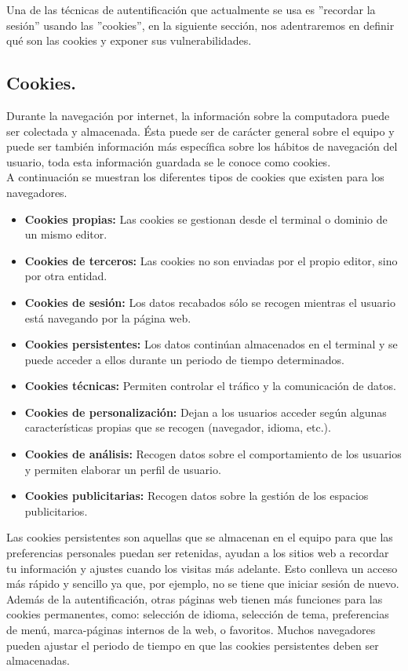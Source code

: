 \documentclass[12pt, a4paper, titlepage]{report}
\begin{document}
	    Una de las técnicas de autentificación que actualmente se usa es ''recordar la sesión'' usando las ''cookies'', en la siguiente sección, nos adentraremos en definir qué son las cookies y exponer sus vulnerabilidades.
	    
	    \subsection{Cookies. }
		Durante la navegación por internet, la información sobre la computadora puede ser colectada y almacenada. Ésta puede ser de carácter general sobre el equipo y puede ser también información más específica sobre los hábitos de navegación del usuario, toda esta información guardada se le conoce como \Gls{cookies}\cite{refCookies}. \\
		A continuación se muestran los diferentes tipos de cookies que existen para los navegadores.
		
		\begin{itemize}
		    \item \textbf{Cookies propias:} Las cookies se gestionan desde el terminal o dominio de un mismo editor.
		    \item \textbf{Cookies de terceros:} Las cookies no son enviadas por el propio editor, sino por otra entidad.  
		    \item \textbf{Cookies de sesión:} Los datos recabados sólo se recogen mientras el usuario está navegando por la página web.
		    \item \textbf{Cookies persistentes:} Los datos continúan almacenados en el terminal y se puede acceder a ellos durante un periodo de tiempo determinados.
		    \item \textbf{Cookies técnicas:} Permiten controlar el tráfico y la comunicación de datos.		
            \item \textbf{Cookies de personalización:} Dejan a los usuarios acceder según algunas características propias que se recogen (navegador, idioma, etc.).
            \item \textbf{Cookies de análisis:} Recogen datos sobre el comportamiento de los usuarios y permiten elaborar un perfil de usuario.
            \item \textbf{Cookies publicitarias:} Recogen datos sobre la gestión de los espacios publicitarios.
        \end{itemize}
		
		Las cookies persistentes son aquellas que se almacenan en el equipo para que las preferencias personales puedan ser retenidas, ayudan a los sitios web a recordar tu información y ajustes cuando los visitas más adelante. Esto conlleva un acceso más rápido y sencillo ya que, por ejemplo, no se tiene que iniciar sesión de nuevo. Además de la autentificación, otras páginas web tienen más funciones para las cookies permanentes, como: selección de idioma, selección de tema, preferencias de menú, marca-páginas internos de la web, o favoritos. \cite{refCookiesPersistentes}
		Muchos navegadores pueden ajustar el periodo de tiempo en que las cookies persistentes deben ser almacenadas. \\
		
\end{document}
